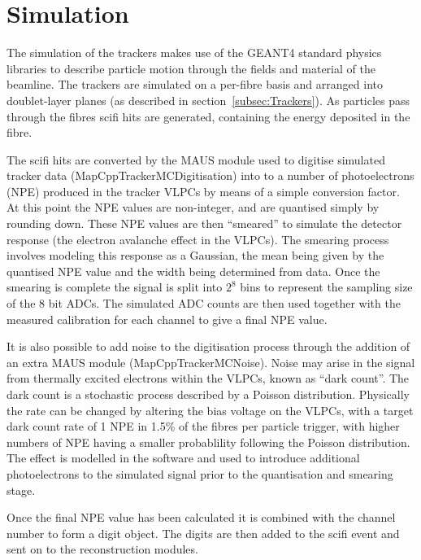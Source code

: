 \section{Simulation}
\label{sec:Simulation}

The simulation of the trackers makes use of the GEANT4 standard physics libraries to describe particle motion through the fields and material of the beamline. The trackers are simulated on a per-fibre basis and arranged into doublet-layer planes (as described in section~\ref{subsec:Trackers}). As particles pass through the fibres scifi hits are generated, containing the energy deposited in the fibre. 

The scifi hits are converted by the MAUS module used to digitise simulated tracker data (MapCppTrackerMCDigitisation) into to a number of photoelectrons (NPE) produced in the tracker VLPCs by means of a simple conversion factor. At this point the NPE values are non-integer, and are quantised simply by rounding down. These NPE values are then ``smeared'' to simulate the detector response (the electron avalanche effect in the VLPCs). The smearing process involves modeling this response as a Gaussian, the mean being given by the quantised NPE value and the width being determined from data. Once the smearing is complete the signal is split into $2^8$ bins to represent the sampling size of the 8 bit ADCs. The simulated ADC counts are then used together with the measured calibration for each channel to give a final NPE value.

It is also possible to add noise to the digitisation process through the addition of an extra MAUS module (MapCppTrackerMCNoise). Noise may arise in the signal from thermally excited electrons within the VLPCs, known as ``dark count''. The dark count is a stochastic process described by a Poisson distribution. Physically the rate can be changed by altering the bias voltage on the VLPCs, with a target dark count rate of 1 NPE in 1.5\% of the fibres per particle trigger, with higher numbers of NPE having a smaller probablility following the Poisson distribution. The effect is modelled in the software and used to introduce additional photoelectrons to the simulated signal prior to the quantisation and smearing stage. 

Once the final NPE value has been calculated it is combined with the channel number to form a digit object. The digits are then added to the scifi event and sent on to the reconstruction modules.



